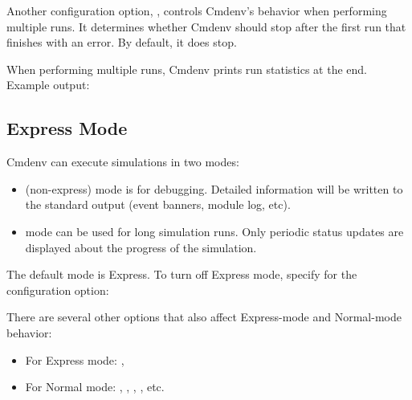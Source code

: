 Another configuration option, , controls
Cmdenv's behavior when performing multiple runs. It determines
whether Cmdenv should stop after the first run that finishes with an
error. By default, it does stop.

When performing multiple runs, Cmdenv prints run statistics at the end. Example
output:



\subsection{Express Mode}
\label{sec:run-sim:cmdenv:express-mode}

Cmdenv can execute simulations in two modes:

\begin{itemize}
    \item {} (non-express) mode is for debugging. Detailed information
        will be written to the standard output (event banners, module log,
        etc).
    \item {} mode can be used for long simulation runs. Only
        periodic status updates are displayed about the progress of the
        simulation.
\end{itemize}

The default mode is Express. To turn off Express mode, specify  for
the  configuration option:


There are several other options that also affect Express-mode and Normal-mode
behavior:

\begin{itemize}
  \item For Express mode: , 
  \item For Normal mode: , ,
        , , etc.
\end{itemize}


